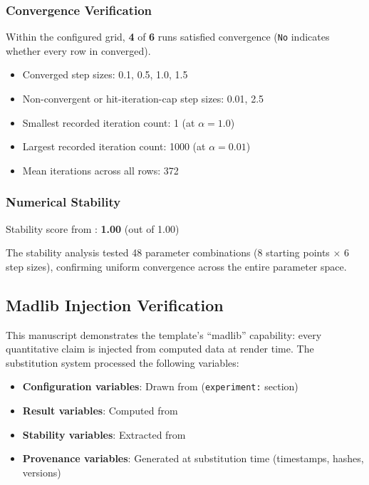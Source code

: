 \documentclass[
]{article}
\providecommand{\tightlist}{%
  \setlength{\itemsep}{0pt}\setlength{\parskip}{0pt}}
\begin{document}
\subsubsection{Convergence Verification}\label{convergence-verification}

Within the configured grid, \textbf{4} of \textbf{6} runs satisfied
 convergence (\texttt{No} indicates whether
every row in  converged).

\begin{itemize}
\tightlist
\item
  Converged step sizes: 0.1, 0.5, 1.0, 1.5
\item
  Non-convergent or hit-iteration-cap step sizes: 0.01, 2.5
\item
  Smallest recorded iteration count: 1 (at \(\alpha = 1.0\))
\item
  Largest recorded iteration count: 1000 (at \(\alpha = 0.01\))
\item
  Mean iterations across all rows: 372
\end{itemize}

\subsubsection{Numerical Stability}\label{numerical-stability}

Stability score from :
\textbf{1.00} (out of 1.00)

The stability analysis tested 48 parameter combinations (8 starting
points \(\times\) 6 step sizes), confirming uniform convergence across
the entire parameter space.

\subsection{Madlib Injection
Verification}\label{madlib-injection-verification}

This manuscript demonstrates the template's ``madlib'' capability: every
quantitative claim is injected from computed data at render time. The
substitution system processed the following variables:

\begin{itemize}
\tightlist
\item
  \textbf{Configuration variables}: Drawn from
   (\texttt{experiment:} section)
\item
  \textbf{Result variables}: Computed from
\item
  \textbf{Stability variables}: Extracted from
\item
  \textbf{Provenance variables}: Generated at substitution time
  (timestamps, hashes, versions)
\end{itemize}
\end{document}
